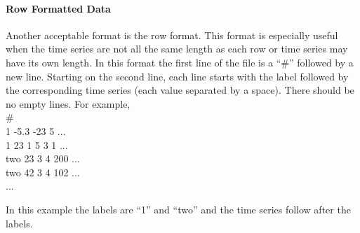\documentclass[titlepage, letterpaper, 12pt]{article}
\newenvironment{allintypewriter}{\ttfamily}{\par}
\begin{document}
\paragraph{Row Formatted Data}
Another acceptable format is the row format.  This format is especially useful  when the time series are not all the same length as each row or time series may have its own length.  In this format the first line of the file is a ``\#'' followed by a new line.  Starting on the second line, each line starts with the label followed by the corresponding time series (each value separated by a space).  There should be no empty lines.  For example,\\
\begin{allintypewriter}
	\noindent\#\\
	1 -5.3 -23 5 ...\\
	1 23 1 5 3 1 ...\\
	two 23 3 4 200 ...\\
	two 42 3 4 102 ...\\
	...
\end{allintypewriter}
In this example the labels are ``1'' and ``two'' and the time series follow after the labels.
\end{document}
